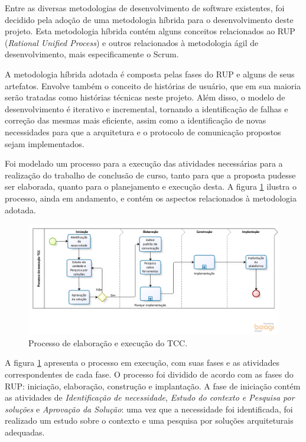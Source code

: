 Entre as diversas metodologias de desenvolvimento de software existentes, foi decidido pela adoção de uma metodologia híbrida para o desenvolvimento deste projeto. Esta metodologia híbrida contém alguns conceitos relacionados ao RUP (\textit{Rational Unified Process}) e outros relacionados à metodologia ágil de desenvolvimento, mais especificamente o Scrum. 

A metodologia híbrida adotada é composta pelas fases do RUP e alguns de seus artefatos. Envolve também o conceito de histórias de usuário, que em sua maioria serão tratadas como histórias técnicas  neste projeto. Além disso, o modelo de desenvolvimento é iterativo e incremental, tornando a identificação de falhas e correção das mesmas mais eficiente, assim como a identificação de novas necessidades para que a arquitetura e o protocolo de comunicação propostos sejam implementados.

Foi modelado um processo para a execução das atividades necessárias para a realização do trabalho de conclusão de curso, tanto para que a proposta pudesse ser elaborada, quanto para o planejamento e execução desta. A figura \ref{processo_tcc} ilustra o processo, ainda em andamento, e contém os aspectos relacionados à metodologia adotada.

\begin{figure}[htb]
\centering
\includegraphics[width=1\textwidth]{figuras/processo_tcc.PNG}
\caption{Processo de elaboração e execução do TCC.}
\label{processo_tcc}
\end{figure}

A figura \ref{processo_tcc} apresenta o processo em execução, com suas fases e as atividades correspondentes de  cada fase. O processo foi dividido de acordo com as fases do RUP: iniciação, elaboração, construção e implantação. A fase de iniciação contém as atividades de \textit{Identificação de necessidade}, \textit{Estudo do contexto e Pesquisa por soluções} e \textit{Aprovação da Solução}: uma vez que a necessidade foi identificada, foi realizado um estudo sobre o contexto e uma pesquisa por soluções arquiteturais adequadas.

